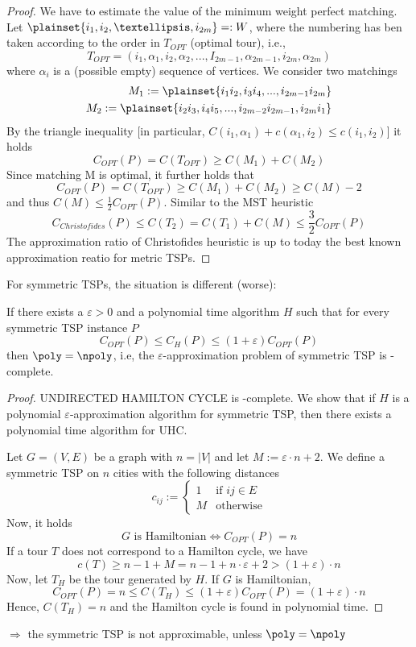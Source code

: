   \begin{proof}
    We have to estimate the value of the  minimum weight perfect matching. Let $\plainset{i_1, i_2, …, i_{2m}}=:W$, where the numbering has ben taken according to the order in $T_{OPT}$ (optimal tour), i.e., \[
      T_{OPT}=(i_1, \alpha_1, i_2, \alpha_2, ..., I_{2m-1}, \alpha_{2m-1}, i_{2m}, \alpha_{2m})
    \]where $\alpha_i$ is a (possible empty) sequence of vertices. We consider two matchings
    \begin{align*}
      M_1 := \plainset{i_1i_2, i_3i_4, ..., i_{2m-1}i_{2m}} \\
      M_2 := \plainset{i_2i_3, i_4i_5, ..., i_{2m-2}i_{2m-1}, i_{2m}i_1} \\
    \end{align*}
    By the triangle inequality [in particular, $C(i_1, \alpha_1) + c(\alpha_1, i_2) \leq c(i_1,i_2)$] it holds \[
      C_{OPT}(P) = C(T_{OPT}) \geq C(M_1) + C(M_2)
    \]
    Since matching M is optimal, it further holds that 
    \[
      C_{OPT}(P) = C(T_{OPT}) \geq C(M_1) + C(M_2) \geq C(M) -2
    \]
    and thus $C(M) \leq \frac12 C_{OPT}(P)$. Similar to the MST heuristic \[
      C_{Christofides}(P) \leq C(T_2) = C(T_1) + C(M) \leq \frac32 C_{OPT}(P)
    \]
    The approximation ratio of Christofides heuristic is up to today the best known approximation reatio for metric TSPs.
    
    
  \end{proof}
  
  For symmetric TSPs, the situation is different (worse):
  
  \begin{thm}
    If there exists a $\varepsilon > 0$ and a polynomial time algorithm $H$ such that for every symmetric TSP instance $P$ \[
      C_{OPT}(P) \leq C_H(P)\leq(1+\varepsilon) C_{OPT}(P)
    \]
    then $\poly = \npoly$, i.e, the $\varepsilon$-approximation problem of symmetric TSP is \npoly-complete.
  \end{thm}
  \begin{proof}
    UNDIRECTED HAMILTON CYCLE is \npoly-complete. We show that if $H$ is a polynomial $\varepsilon$-approximation algorithm for symmetric TSP, then there exists a polynomial time algorithm for UHC.
    
    Let $G = (V,E)$ be a graph with $n = |V|$ and let $M := \varepsilon \cdot n + 2$. We define a symmetric TSP on $n$ cities with the following distances \[
      c_{ij}:=\begin{cases}1 & \text{if } ij \in E \\ M & \text{otherwise}\end{cases}
    \]
    Now, it holds \[
      G \text{ is Hamiltonian} \Leftrightarrow C_{OPT}(P) = n
    \]
    If a tour $T$ does not correspond to a Hamilton cycle, we have \[
      c(T) \geq n-1 + M=n-1+ n\cdot \varepsilon + 2 > (1+\varepsilon) \cdot n
    \]
    Now, let $T_H$ be the tour generated by $H$.
    If $G$ is Hamiltonian,\[
      C_{OPT}(P) = n \leq C(T_H)\leq (1+\varepsilon)C_{OPT}(P)=(1+\varepsilon)\cdot n
    \]Hence, $C(T_H) = n $ and the Hamilton cycle is found in polynomial time.
  \end{proof}
  
  $\Rightarrow$ the symmetric TSP is not approximable, unless $\poly = \npoly$